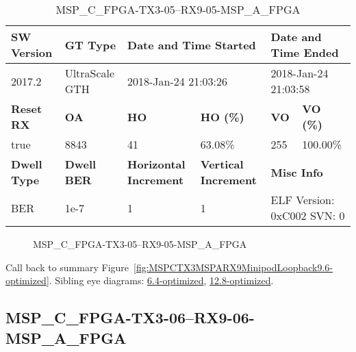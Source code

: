 \begin{table}[h]
\centering
\caption{MSP\_C\_FPGA-TX3-05--RX9-05-MSP\_A\_FPGA}
\label{tab:MSPCFPGATX305RX905MSPAFPGA9.6-optimized}
\begin{tabular}{@{}|l|l|l|l|l|l|@{}}
\toprule
\textbf{SW Version}                & \textbf{GT Type}   & \multicolumn{2}{l|}{\textbf{Date and Time Started}}            & \multicolumn{2}{l|}{\textbf{Date and Time Ended}}        \\ \midrule
2017.2                       & UltraScale GTH          & \multicolumn{2}{l|}{2018-Jan-24 21:03:26}                   & \multicolumn{2}{l|}{2018-Jan-24 21:03:58}               \\ \midrule
\textbf{Reset RX}                  & \textbf{OA} & \textbf{HO}   & \textbf{HO (\%)} & \textbf{VO} & \textbf{VO (\%)} \\ \midrule
true & 8843        & 41          & 63.08\%        & 255        & 100.00\%       \\ \midrule
\textbf{Dwell Type}                & \textbf{Dwell BER} & \textbf{Horizontal Increment} & \textbf{Vertical Increment}    & \multicolumn{2}{l|}{\textbf{Misc Info}}                  \\ \midrule
BER                            & 1e-7        & 1        & 1           & \multicolumn{2}{l|}{ELF Version: 0xC002 SVN: 0}                         \\ \bottomrule
\end{tabular}
\end{table}

\begin{figure}[h]
\caption{MSP\_C\_FPGA-TX3-05--RX9-05-MSP\_A\_FPGA} \label{fig:MSPCFPGATX305RX905MSPAFPGA9.6-optimized}
\end{figure}

Call back to summary Figure~\ref{fig:MSPCTX3MSPARX9MinipodLoopback9.6-optimized}.
Sibling eye diagrams: \hyperref[sec:MSPCFPGATX305RX905MSPAFPGA6.4-optimized]{6.4-optimized}, \hyperref[sec:MSPCFPGATX305RX905MSPAFPGA12.8-optimized]{12.8-optimized}.

\clearpage
\newpage


\subsection{MSP\_C\_FPGA-TX3-06--RX9-06-MSP\_A\_FPGA}\label{sec:MSPCFPGATX306RX906MSPAFPGA9.6-optimized}

